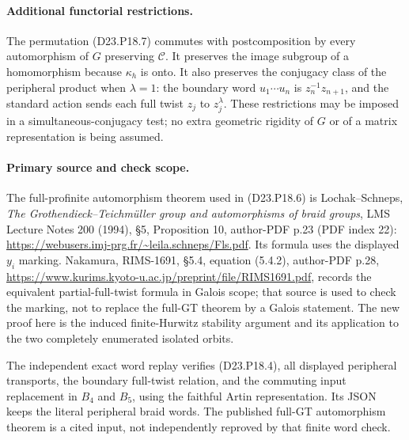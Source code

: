 \paragraph{Additional functorial restrictions.}
The permutation (D23.P18.7) commutes with postcomposition by
every automorphism of $G$ preserving $\mathcal C$. It preserves
the image subgroup of a homomorphism because $\kappa_h$ is
onto. It also preserves the conjugacy class of the peripheral
product when $\lambda=1$: the boundary word $u_1\cdots u_n$
is $z_n^{-1}z_{n+1}$, and the standard action sends each full
twist $z_j$ to $z_j^\lambda$. These restrictions may be imposed
in a simultaneous-conjugacy test; no extra geometric rigidity
of $G$ or of a matrix representation is being assumed.

\paragraph{Primary source and check scope.}
The full-profinite automorphism theorem used in
(D23.P18.6) is Lochak--Schneps, \emph{The
Grothendieck--Teichm\"uller group and automorphisms of braid
groups}, LMS Lecture Notes 200 (1994), \S5, Proposition 10,
author-PDF p.23 (PDF index 22):
\url{https://webusers.imj-prg.fr/~leila.schneps/Fls.pdf}.
Its formula uses the displayed $y_i$ marking. Nakamura,
RIMS-1691, \S5.4, equation (5.4.2), author-PDF p.28,
\url{https://www.kurims.kyoto-u.ac.jp/preprint/file/RIMS1691.pdf},
records the equivalent partial-full-twist formula in Galois
scope; that source is used to check the marking, not to
replace the full-GT theorem by a Galois statement.
The new proof here is the induced finite-Hurwitz stability
argument and its application to the two completely enumerated
isolated orbits.

The independent exact word replay
 verifies
(D23.P18.4), all displayed peripheral transports, the boundary
full-twist relation, and the commuting input replacement in
$B_4$ and $B_5$, using the faithful Artin representation.
Its JSON keeps the literal peripheral braid words. The
published full-GT automorphism theorem is a cited input, not
independently reproved by that finite word check.
